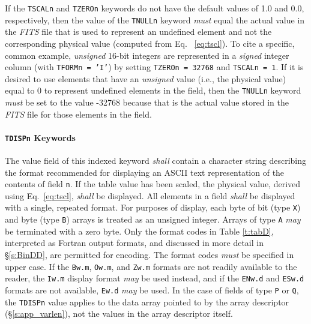 \documentclass[11pt,makeidx]{book}     %
\begin{document}
   If the {\tt TSCALn} and {\tt TZEROn} keywords do not have the
 default values of 1.0 and 0.0, respectively, then the value of the
 {\tt TNULLn} keyword {\em must} equal the actual value in the 
 {\em FITS\/} file that is used to represent an undefined element
 and not the corresponding physical value (computed from 
 Eq. \ \ref{eq:tscl}).  To cite a specific, common example,  {\em
 unsigned} 16-bit integers are represented in a {\em signed}
 integer column (with {\tt TFORMn = 'I'}) by setting 
 {\tt TZEROn = 32768} and {\tt TSCALn = 1}.  If it is desired  to
 use elements that have an {\em unsigned} value (i.e., the physical
 value) equal to 0 to represent  undefined elements in the field,
 then the {\tt TNULLn}  keyword {\em must} be set to the value
 -32768   because that is the actual value stored in the {\em FITS}
 file for those elements in the field. 
 
   \paragraph{{\tt TDISPn} Keywords}  The value field of this
 indexed keyword {\em shall} contain a character string
 describing the format recommended for displaying an ASCII text
 representation of the contents
 of field {\tt n}.  If the table value has been scaled, the
 physical value, derived using Eq.\ \ref{eq:tscl}, {\em shall} be
 displayed.  All elements in a field                                         
 {\em shall} be displayed with a single, repeated format. For purposes of
 display, each byte of bit (type {\tt X}) and byte (type {\tt B})
 arrays is treated as an unsigned integer. Arrays of type {\tt A} {\em may} be
 terminated with a zero byte.  Only the format codes in 
 Table \ref{t:tabD}, interpreted as Fortran \cite{iso04} 
 output formats, and discussed in more detail in \S\ref{s:BinDD}, 
 are permitted for encoding. The format codes {\em must} be specified in upper case.
 If the {\tt Bw.m}, {\tt Ow.m}, and {\tt Zw.m} formats are 
 not readily available to the reader, the {\tt Iw.m} display format {\em may} be used 
 instead, and if the {\tt ENw.d} and {\tt ESw.d} formats are not available, 
 {\tt Ew.d} {\em may} 
 be used.  In the case of fields of type {\tt P} or {\tt Q}, the {\tt TDISPn} value applies
 to the data array pointed to by the array descriptor (\S\ref{s:app_varlen}), 
 not the values in the array descriptor itself.
\end{document}
